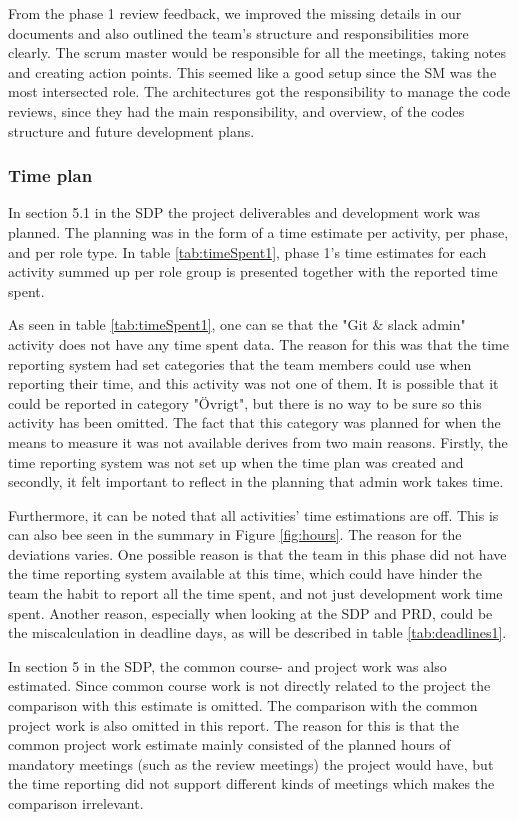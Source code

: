 \documentclass{article}
\begin{document}
From the phase 1 review feedback, we improved the missing details in our documents and also outlined the team's structure and responsibilities more clearly. The scrum master would be responsible for all the meetings, taking notes and creating action points. This seemed like a good setup since the SM was the most intersected role. The architectures got the responsibility to manage the code reviews, since they had the main responsibility, and overview, of the codes structure and future development plans.

\subsubsection{Time plan}
In section 5.1 in the SDP \cite{SDP} the project deliverables and development work was planned. The planning was in the form of a time estimate per activity, per phase, and per role type. In table \ref{tab:timeSpent1}, phase 1's time estimates for each activity summed up per role group is presented together with the reported time spent. 

As seen in table \ref{tab:timeSpent1}, one can se that the "Git \& slack admin" activity does not have any time spent data. The reason for this was that the time reporting system had set categories that the team members could use when reporting their time, and this activity was not one of them. It is possible that it could be reported in category "Övrigt", but there is no way to be sure so this activity has been omitted. The fact that this category was planned for when the means to measure it was not available derives from two  main reasons. Firstly, the time reporting system was not set up when the time plan was created and secondly, it felt important to reflect in the planning that admin work takes time.  

Furthermore, it can be noted that all activities' time estimations are off. This is can also bee seen in the summary in Figure \ref{fig:hours}. The reason for the deviations varies. One possible reason is that the team in this phase did not have the time reporting system available at this time, which could have hinder the team the habit to report all the time spent, and not just development work time spent. Another reason, especially when looking at the SDP and PRD, could be the miscalculation in deadline days, as will be described in table \ref{tab:deadlines1}.

In section 5 in the SDP, the common course- and project work was also estimated. Since common course work is not directly related to the project the comparison with this estimate is omitted. The comparison with the common project work is also omitted in this report. The reason for this is that the common project work estimate mainly consisted of the planned hours of mandatory meetings (such as the review meetings) the project would have, but the time reporting did not support different kinds of meetings which makes the comparison irrelevant. 
\end{document}
